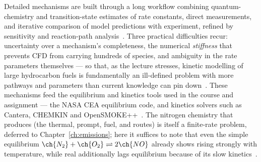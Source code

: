 Detailed mechanisms are built through a long workflow combining quantum-chemistry and transition-state estimates of rate constants, direct measurements, and iterative comparison of model predictions with experiment, refined by sensitivity and reaction-path analysis~\cite{lecture3}. Three practical difficulties recur: uncertainty over a mechanism's completeness, the numerical \emph{stiffness} that prevents CFD from carrying hundreds of species, and ambiguity in the rate parameters themselves --- so that, as the lecture stresses, kinetic modelling of large hydrocarbon fuels is fundamentally an ill-defined problem with more pathways and parameters than current knowledge can pin down~\cite{lecture3}. These mechanisms feed the equilibrium and kinetics tools used in the course and assignment --- the NASA CEA equilibrium code, and kinetics solvers such as Cantera, CHEMKIN and OpenSMOKE++~\cite{lecture3,cantera}. The nitrogen chemistry that produces  (the thermal, prompt, fuel,  and  routes) is itself a finite-rate problem, deferred to Chapter~\ref{ch:emissions}; here it suffices to note that even the simple equilibrium $\ch{N_2}+\ch{O_2}\rightleftharpoons2\ch{NO}$ already shows  rising strongly with temperature, while real  additionally lags equilibrium because of its slow kinetics~\cite{lecture3}.
